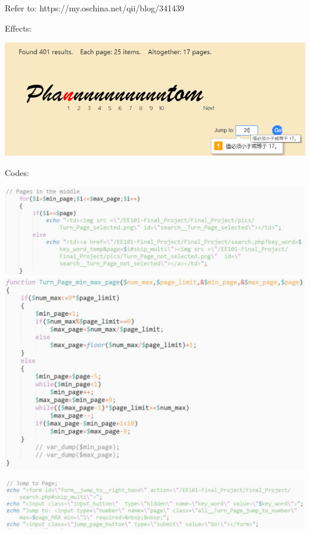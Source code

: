 \documentclass[10pt,twoside,a4paper,titlepage]{article}
\begin{document}
		Refer to: https://my.oschina.net/qii/blog/341439\newline\par
		Effects:\newline\par
		\includegraphics[width=1\textwidth]{gzl/05.png}\newline\par
		Codes:\newline\par
		\includegraphics[width=1\textwidth]{gzl/04.jpg}
		\newpage
		\includegraphics[width=1\textwidth]{gzl/05.jpg}\newline\par
		\includegraphics[width=1\textwidth]{gzl/06.jpg}\newline\par
\end{document}

